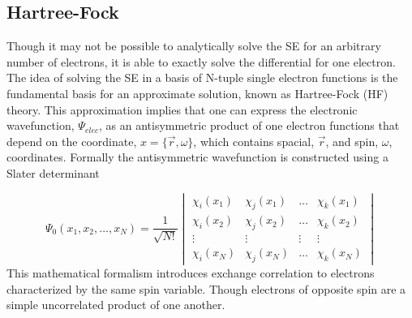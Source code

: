   \subsection{Hartree-Fock}
    Though it may not be possible to analytically solve the SE for an arbitrary number of electrons, it is able to exactly solve the differential for one electron.  The idea of solving the SE in a basis of N-tuple single electron functions is the fundamental basis for an approximate solution, known as Hartree-Fock (HF) theory. \cite{Hartree1928, Fock1930, SzaboAttila1982, Sherril2000} This approximation implies that one can express the electronic wavefunction, $\Psi_{elec}$, as an antisymmetric product of one electron functions that depend on the coordinate, $x = \{\vec{r}, \omega\}$, which contains spacial, $\vec{r}$, and spin, $\omega$, coordinates. Formally the antisymmetric wavefunction is constructed using a Slater determinant\cite{Slater1929, Slater1930} 

    \begin{equation}
    \Psi_{0}(x_1, x_2, ..., x_N) = \frac{1}{\sqrt{N!}}
    \begin{vmatrix}
     \chi_i(x_1) &\chi_j(x_1) &\ldots   &\chi_k(x_1)   \\
     \chi_i(x_2) &\chi_j(x_2)  &\ldots & \chi_k(x_2)   \\
     \vdots&\vdots   &\vdots &\vdots   \\
     \chi_i(x_N) &\chi_j(x_N) & \ldots & \chi_k(x_N)
    \end{vmatrix}
    \end{equation}
    This mathematical formalism introduces exchange correlation to electrons characterized by the same spin variable.  Though electrons of opposite spin are a simple uncorrelated product of one another.
    
